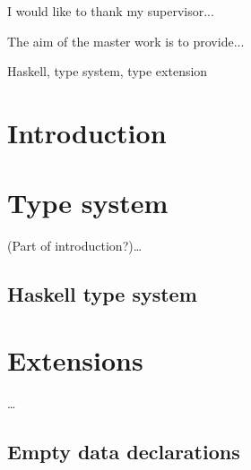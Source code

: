\documentclass[11pt,oneside,draft]{fithesis2}
\begin{document}
\FrontMatter
\ThesisTitlePage

\begin{ThesisDeclaration}
\DeclarationText
\AdvisorName
\end{ThesisDeclaration}

\begin{ThesisThanks}
I would like to thank my supervisor...
\end{ThesisThanks}

\begin{ThesisAbstract}
The aim of the master work is to provide...
\end{ThesisAbstract}

\begin{ThesisKeyWords}
Haskell, type system, type extension
\end{ThesisKeyWords}

\tableofcontents

\MainMatter

\chapter{Introduction}

\cite{barendregt:1992:lambda, libor}

\chapter{Type system}

(Part of introduction?)\dots

\section{Haskell type system}

\cite{haskell2010}

\chapter{Extensions}

\dots

\section{Empty data declarations}
\end{document}
